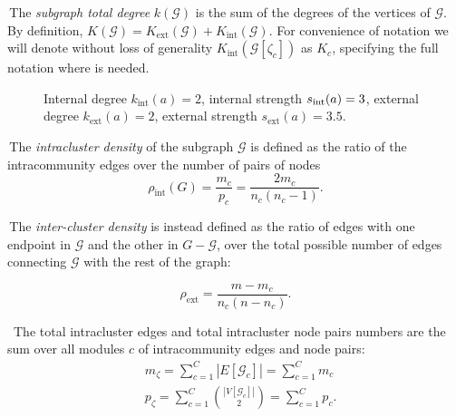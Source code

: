 \noindent\textbullet \,The \emph{subgraph total degree} $k(\mathcal{G})$ is the sum of the degrees of the vertices of $\mathcal{G}$.
By definition, $K(\mathcal{G}) = K_{\textrm{ext}}(\mathcal{G}) + K_{\textrm{int}}(\mathcal{G})$.
For convenience of notation we will denote without loss of generality $K_{\textrm{int}}(\mathcal{G}[ \zeta_c ])$ as $K_c$, specifying the full notation where is needed.

\begin{figure}[htb]\centering
{}
\caption{Internal degree $k_{\textrm{int}}(a)=2$, internal strength $s_{\textrm{\textrm{int}}}(a)=3$, external degree $k_{\textrm{ext}}(a)=2$, external strength $s_{\textrm{ext}}(a)=3.5$.}
\label{fig:internaldegree}
\end{figure}

\noindent\textbullet \,The \emph{intracluster density} of the subgraph $\mathcal{G}$ is defined as the ratio of the intracommunity edges over the number of pairs of nodes
\begin{equation}
\rho_{\textrm{int}}(G)=\frac{m_c}{p_c} = \frac{2 m_c}{n_c(n_c-1)}.
\end{equation}

\noindent\textbullet \,The \emph{inter-cluster density} is instead defined as the ratio of edges with one endpoint in $\mathcal{G}$ and the other in $G-\mathcal{G}$, over the total possible number of edges connecting $\mathcal{G}$ with the rest of the graph: 

\begin{equation}
\rho_{\textrm{ext}}=\frac{m-m_c}{n_c(n-n_c)}.
\end{equation}

\noindent\textbullet \, The total intracluster edges and total intracluster node pairs numbers are the sum over all modules $c$ of intracommunity edges and node pairs:
\begin{align}
&m_\zeta= \sum \limits_{c=1}^C |E \left[ \mathcal{G}_c \right]| = \sum \limits_{c=1}^C m_c \\
&p_\zeta= \sum \limits_{c=1}^C \binom{|V \left[ \mathcal{G}_c \right]|}{2} = \sum \limits_{c=1}^C p_c.
\end{align}

